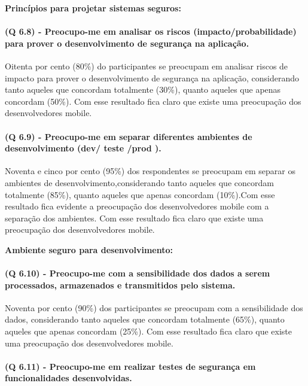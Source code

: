 \vspace{0.5cm}
\noindent\textbf{Princípios para projetar sistemas seguros:}
\paragraph{\textbf{(Q 6.8)} - Preocupo-me em analisar os riscos (impacto/probabilidade) para prover o desenvolvimento de segurança na aplicação.}

Oitenta por cento (80{\%}) do participantes se preocupam em analisar riscos de impacto para prover o desenvolvimento de segurança na aplicação, considerando tanto aqueles que concordam totalmente (30{\%}), quanto aqueles que apenas concordam (50{\%}). Com esse resultado fica claro que existe uma preocupação dos desenvolvedores mobile.

\paragraph{\textbf{(Q 6.9)} - Preocupo-me em separar diferentes ambientes de desenvolvimento (dev/ teste /prod ).}

Noventa e cinco por cento (95{\%}) dos respondentes se preocupam em separar os ambientes de desenvolvimento,considerando tanto aqueles que concordam totalmente (85{\%}), quanto aqueles que apenas concordam (10{\%}).Com esse resultado fica evidente a preocupação dos desenvolvedores mobile com a separação dos ambientes. Com esse resultado fica claro que existe uma preocupação dos desenvolvedores mobile.


\vspace{0.5cm}
\noindent\textbf{Ambiente seguro para desenvolvimento:}
\paragraph{\textbf{(Q 6.10)} - Preocupo-me com a sensibilidade dos dados a serem processados, armazenados e transmitidos pelo sistema.}

Noventa por cento (90{\%}) dos participantes se preocupam com a sensibilidade dos dados, considerando tanto aqueles que concordam totalmente (65{\%}), quanto aqueles que apenas concordam (25{\%}). Com esse resultado fica claro que existe uma preocupação dos desenvolvedores mobile.

\paragraph{\textbf{(Q 6.11)} - Preocupo-me em realizar testes de segurança em funcionalidades desenvolvidas.}

